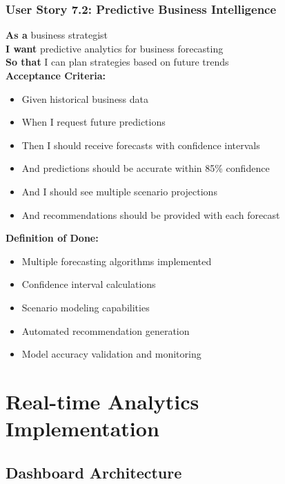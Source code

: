\subsubsection{User Story 7.2: Predictive Business Intelligence}

\begin{tcolorbox}[colback=lightgray, colframe=primaryblue, title=US-7.2: Predictive Business Intelligence]
\textbf{As a} business strategist \\
\textbf{I want} predictive analytics for business forecasting \\
\textbf{So that} I can plan strategies based on future trends \\

\textbf{Acceptance Criteria:}
\begin{itemize}
    \item Given historical business data
    \item When I request future predictions
    \item Then I should receive forecasts with confidence intervals
    \item And predictions should be accurate within 85\% confidence
    \item And I should see multiple scenario projections
    \item And recommendations should be provided with each forecast
\end{itemize}

\textbf{Definition of Done:}
\begin{itemize}
    \item Multiple forecasting algorithms implemented
    \item Confidence interval calculations
    \item Scenario modeling capabilities
    \item Automated recommendation generation
    \item Model accuracy validation and monitoring
\end{itemize}
\end{tcolorbox}

\section{Real-time Analytics Implementation}

\subsection{Dashboard Architecture}

